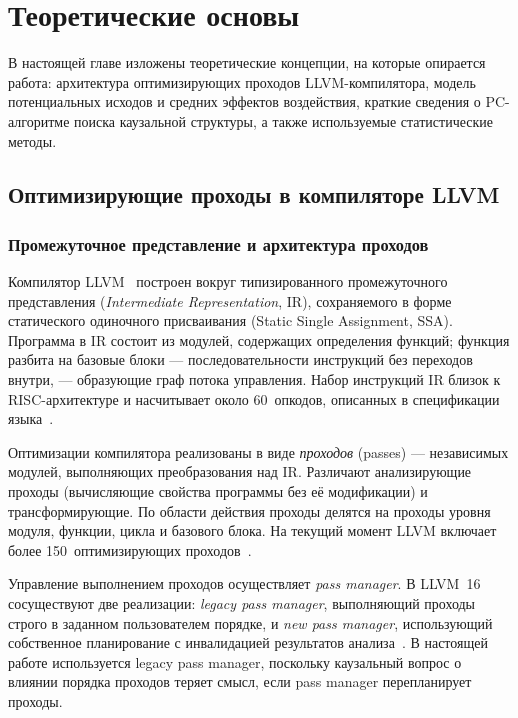 \section{Теоретические основы}

В настоящей главе изложены теоретические концепции, на которые опирается работа: архитектура оптимизирующих проходов LLVM-компилятора, модель потенциальных исходов и средних эффектов воздействия, краткие сведения о PC-алгоритме поиска каузальной структуры, а также используемые статистические методы.

\subsection{Оптимизирующие проходы в компиляторе LLVM}

\subsubsection{Промежуточное представление и архитектура проходов}

Компилятор LLVM~\cite{lattner2004llvm} построен вокруг типизированного промежуточного представления (\emph{Intermediate Representation}, IR), сохраняемого в форме статического одиночного присваивания (Static Single Assignment, SSA). Программа в IR состоит из модулей, содержащих определения функций; функция разбита на базовые блоки --- последовательности инструкций без переходов внутри, --- образующие граф потока управления. Набор инструкций IR близок к RISC-архитектуре и насчитывает около 60~опкодов, описанных в спецификации языка~\cite{llvm_langref}.

Оптимизации компилятора реализованы в виде \emph{проходов} (passes) --- независимых модулей, выполняющих преобразования над IR. Различают анализирующие проходы (вычисляющие свойства программы без её модификации) и трансформирующие. По области действия проходы делятся на проходы уровня модуля, функции, цикла и базового блока. На текущий момент LLVM включает более 150~оптимизирующих проходов~\cite{ashouri2018survey, llvm_passes}.

Управление выполнением проходов осуществляет \emph{pass manager}. В LLVM~16 сосуществуют две реализации: \emph{legacy pass manager}, выполняющий проходы строго в заданном пользователем порядке, и \emph{new pass manager}, использующий собственное планирование с инвалидацией результатов анализа~\cite{llvm_passes}. В настоящей работе используется legacy pass manager, поскольку каузальный вопрос о влиянии порядка проходов теряет смысл, если pass manager перепланирует проходы.

